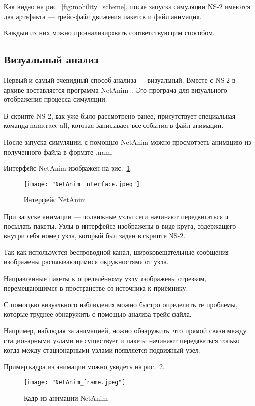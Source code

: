 Как видно на рис.~\ref{fig:mobility_scheme}, после запуска симуляции NS-2 имеются два артефакта --- трейс-файл движения пакетов и файл анимации.

Каждый из них можно проанализировать соответствующим способом. 

\subsection{Визуальный анализ}

Первый и самый очевидный способ анализа --- визуальный. Вместе с NS-2 в архиве  поставляется программа NetAnim~\cite{netanim}. Это програма для визуального отображения процесса симуляции.

В скрипте NS-2, как уже было рассмотрено ранее, присутствует специальная команда namtrace-all, которая записывает все события в файл анимации. 

После запуска симуляции, с помощью NetAnim можно просмотреть анимацию из полученного файла в формате .nam.

Интерфейс NetAnim изображён на рис.~\ref{fig:netanim_interface}.

\begin{figure}[!h]
  \centering
  \texttt{[image: "NetAnim\_interface.jpeg"]}
  \caption{Интерфейс NetAnim}
  \label{fig:netanim_interface}
\end{figure}

При запуске анимации --- подвижные узлы сети начинают передвигаться и посылать пакеты. Узлы в интерфейсе изображены в виде круга, содержащего внутри себя номер узла, который был задан в скрипте NS-2. 

Так как используется беспроводной канал, широковещательные сообщения изображены расплывающимися окружностями от узла. 

Направленные пакеты к определённому узлу изображены отрезком, перемещающимся в пространстве от источника к приёмнику.

С помощью визуального наблюдения можно быстро определить те проблемы, которые труднее обнаружить с помощью анализа трейс-файла. 

Например, наблюдая за анимацией, можно обнаружить, что прямой связи между стационарными узлами не существует и пакеты начинают передаваться только когда между стационарными узлами появляется подвижный узел.

Пример кадра из анимации можно увидеть на рис.~\ref{fig:netanim_frame}.

\begin{figure}[!h]
  \centering
  \texttt{[image: "NetAnim\_frame.jpeg"]}
  \caption{Кадр из анимации NetAnim}
  \label{fig:netanim_frame}
\end{figure}


